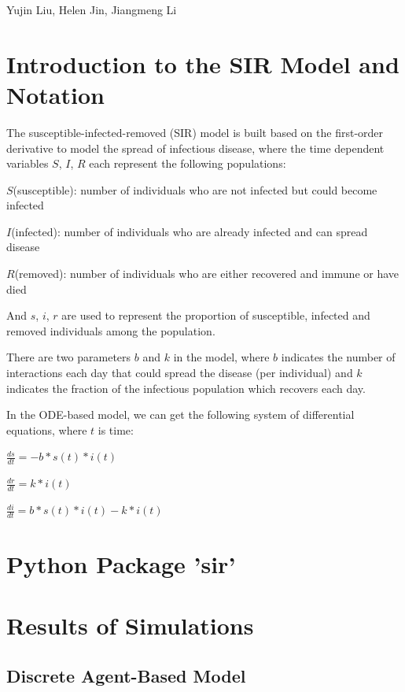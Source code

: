 \documentclass{article}
\begin{document}
\begin{titlepage}
  \begin{center}
  \huge{Yujin Liu, Helen Jin, Jiangmeng Li}
  \end{center}


\end{titlepage}


\section{Introduction to the SIR Model and Notation}
The susceptible-infected-removed (SIR) model is built based on the first-order derivative to model the spread of infectious disease, where the time dependent variables $S$, $I$, $R$ each represent the following populations:

$S$(susceptible): number of individuals who are not infected but could become infected

$I$(infected): number of individuals who are already infected and can spread disease

$R$(removed): number of individuals who are either recovered and immune or have died

And $s$, $i$, $r$ are used to represent the proportion of susceptible, infected and removed individuals among the population.

There are two parameters $b$ and $k$ in the model, where $b$ indicates the number of interactions each day that could spread the disease (per individual) and $k$ indicates the fraction of the infectious population which recovers each day.

In the ODE-based model, we can get the following system of differential equations, where $t$ is time:

$\frac{ds}{dt} = -b * s(t) * i(t)$

$\frac{dr}{dt} = k * i(t)$

$\frac{di}{dt} = b * s(t) * i(t) - k * i(t)$
\section{Python Package 'sir'}


\section{Results of Simulations}
\subsection{Discrete Agent-Based Model}
\end{document}
